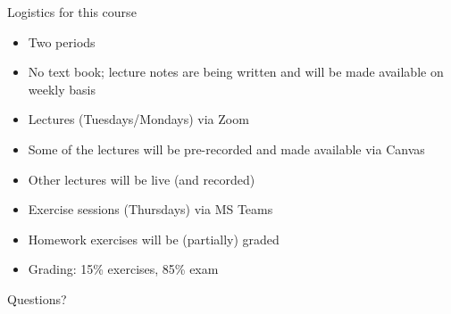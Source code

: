 \documentclass{beamer}
\begin{document}
%  
%  
\begin{frame}{Logistics for this course}
  \begin{itemize}
    \item Two periods
    \item No text book; lecture notes are being written and will be made available on weekly basis
    \item Lectures (Tuesdays/Mondays) via Zoom
    \item Some of the lectures will be pre-recorded and made available via Canvas
    \item Other lectures will be live (and recorded)
    \item Exercise sessions (Thursdays) via MS Teams
    \item Homework exercises will be (partially) graded
    \item Grading: 15\% exercises, 85\% exam
  \end{itemize}

  \bigskip
  Questions?
\end{frame}
\end{document}
